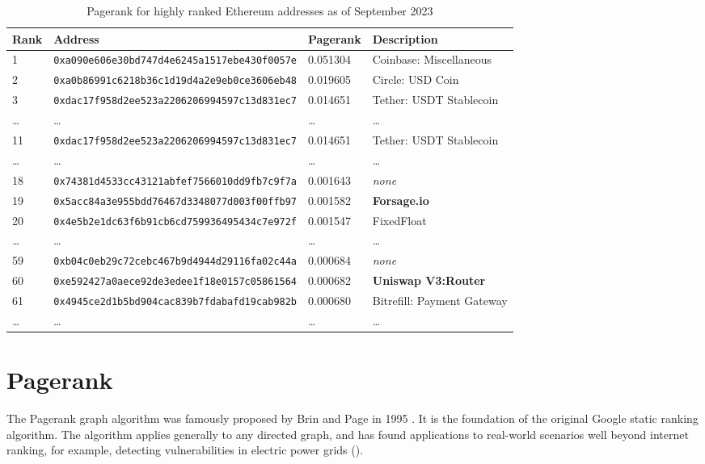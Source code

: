 \documentclass[a4paper]{article}
\begin{document}
\begin{table*}[t]
\centering
\begin{tabular}{|l|l|l|l|}
\hline
Rank & Address & Pagerank & Description \\ \hline
1 & \texttt{0xa090e606e30bd747d4e6245a1517ebe430f0057e} & 0.051304 & Coinbase: Miscellaneous\\
2 & \texttt{0xa0b86991c6218b36c1d19d4a2e9eb0ce3606eb48} & 0.019605 & Circle: USD Coin\\
3 & \texttt{0xdac17f958d2ee523a2206206994597c13d831ec7} & 0.014651 & Tether: USDT Stablecoin\\
\ldots & \ldots & \ldots & \ldots\\
11  & \texttt{0xdac17f958d2ee523a2206206994597c13d831ec7} & 0.014651 & Tether: USDT Stablecoin\\
\ldots & \ldots & \ldots & \ldots\\
18	& \texttt{0x74381d4533cc43121abfef7566010dd9fb7c9f7a} & 0.001643 & \textit{none}\\
19 & \texttt{0x5acc84a3e955bdd76467d3348077d003f00ffb97} & 0.001582 & \textbf{Forsage.io}\\
20	& \texttt{0x4e5b2e1dc63f6b91cb6cd759936495434c7e972f} & 0.001547 & FixedFloat \\
\ldots & \ldots & \ldots & \ldots\\
59	& \texttt{0xb04c0eb29c72cebc467b9d4944d29116fa02c44a} & 0.000684 &   \textit{none}\\
60 & \texttt{0xe592427a0aece92de3edee1f18e0157c05861564} & 0.000682 & \textbf{Uniswap V3:Router}\\ 
61	& \texttt{0x4945ce2d1b5bd904cac839b7fdabafd19cab982b} & 0.000680 &  Bitrefill: Payment Gateway\\
\ldots & \ldots & \ldots & \ldots\\
\hline
\end{tabular}
\caption[Pageranks]{Pagerank for highly ranked Ethereum addresses as of September 2023\footnotemark}
\label{pagerank-table}
\bigskip

\end{table*}

\section{Pagerank}

The Pagerank graph algorithm was famously proposed by Brin and Page in 1995 \cite{Pagerank}. It is the foundation of the original Google static ranking algorithm.  The algorithm applies generally to any directed graph, and has found applications to real-world scenarios well beyond internet ranking, for example, detecting vulnerabilities in electric power grids (\cite{Powergrid}).
\end{document}

